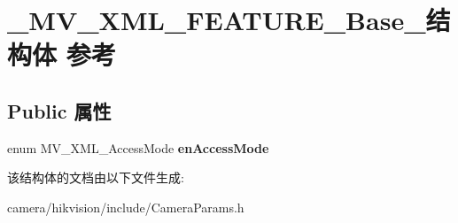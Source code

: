\hypertarget{struct___m_v___x_m_l___f_e_a_t_u_r_e___base__}{}\section{\+\_\+\+M\+V\+\_\+\+X\+M\+L\+\_\+\+F\+E\+A\+T\+U\+R\+E\+\_\+\+Base\+\_\+结构体 参考}
\label{struct___m_v___x_m_l___f_e_a_t_u_r_e___base__}
\subsection*{Public 属性}
\begin{DoxyCompactItemize}
\item 
\mbox{\label{struct___m_v___x_m_l___f_e_a_t_u_r_e___base___aa4d95339bcb61676a0bcb1946980928a}} 
enum M\+V\+\_\+\+X\+M\+L\+\_\+\+Access\+Mode {\bfseries en\+Access\+Mode}
\end{DoxyCompactItemize}


该结构体的文档由以下文件生成\+:\begin{DoxyCompactItemize}
\item 
camera/hikvision/include/Camera\+Params.\+h\end{DoxyCompactItemize}

